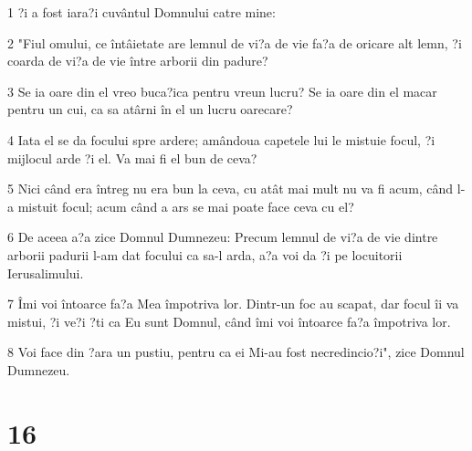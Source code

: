 \par 1 ?i a fost iara?i cuvântul Domnului catre mine:
\par 2 "Fiul omului, ce întâietate are lemnul de vi?a de vie fa?a de oricare alt lemn, ?i coarda de vi?a de vie între arborii din padure?
\par 3 Se ia oare din el vreo buca?ica pentru vreun lucru? Se ia oare din el macar pentru un cui, ca sa atârni în el un lucru oarecare?
\par 4 Iata el se da focului spre ardere; amândoua capetele lui le mistuie focul, ?i mijlocul arde ?i el. Va mai fi el bun de ceva?
\par 5 Nici când era întreg nu era bun la ceva, cu atât mai mult nu va fi acum, când l-a mistuit focul; acum când a ars se mai poate face ceva cu el?
\par 6 De aceea a?a zice Domnul Dumnezeu: Precum lemnul de vi?a de vie dintre arborii padurii l-am dat focului ca sa-l arda, a?a voi da ?i pe locuitorii Ierusalimului.
\par 7 Îmi voi întoarce fa?a Mea împotriva lor. Dintr-un foc au scapat, dar focul îi va mistui, ?i ve?i ?ti ca Eu sunt Domnul, când îmi voi întoarce fa?a împotriva lor.
\par 8 Voi face din ?ara un pustiu, pentru ca ei Mi-au fost necredincio?i", zice Domnul Dumnezeu.

\chapter{16}


